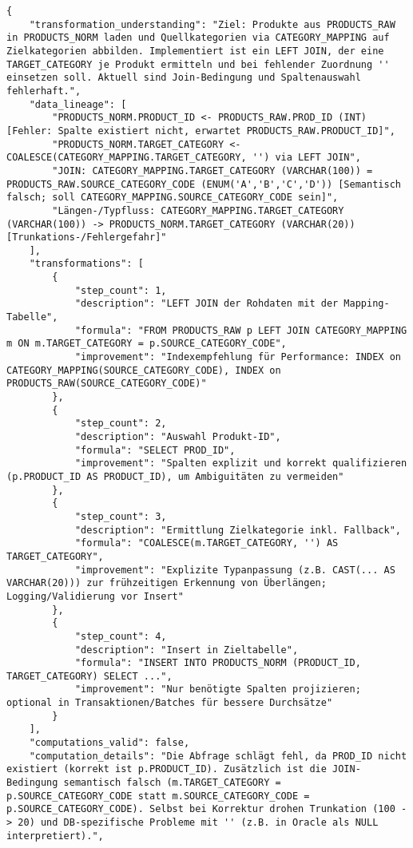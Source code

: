 \begin{lstlisting}[caption={Ausgabe: GPT-5 Anwendungsfall 6 Konsistenzdurchlauf},label={gpt_case6_prompt2}]
{
    "transformation_understanding": "Ziel: Produkte aus PRODUCTS_RAW in PRODUCTS_NORM laden und Quellkategorien via CATEGORY_MAPPING auf Zielkategorien abbilden. Implementiert ist ein LEFT JOIN, der eine TARGET_CATEGORY je Produkt ermitteln und bei fehlender Zuordnung '' einsetzen soll. Aktuell sind Join-Bedingung und Spaltenauswahl fehlerhaft.",
    "data_lineage": [
        "PRODUCTS_NORM.PRODUCT_ID <- PRODUCTS_RAW.PROD_ID (INT) [Fehler: Spalte existiert nicht, erwartet PRODUCTS_RAW.PRODUCT_ID]",
        "PRODUCTS_NORM.TARGET_CATEGORY <- COALESCE(CATEGORY_MAPPING.TARGET_CATEGORY, '') via LEFT JOIN",
        "JOIN: CATEGORY_MAPPING.TARGET_CATEGORY (VARCHAR(100)) = PRODUCTS_RAW.SOURCE_CATEGORY_CODE (ENUM('A','B','C','D')) [Semantisch falsch; soll CATEGORY_MAPPING.SOURCE_CATEGORY_CODE sein]",
        "Längen-/Typfluss: CATEGORY_MAPPING.TARGET_CATEGORY (VARCHAR(100)) -> PRODUCTS_NORM.TARGET_CATEGORY (VARCHAR(20)) [Trunkations-/Fehlergefahr]"
    ],
    "transformations": [
        {
            "step_count": 1,
            "description": "LEFT JOIN der Rohdaten mit der Mapping-Tabelle",
            "formula": "FROM PRODUCTS_RAW p LEFT JOIN CATEGORY_MAPPING m ON m.TARGET_CATEGORY = p.SOURCE_CATEGORY_CODE",
            "improvement": "Indexempfehlung für Performance: INDEX on CATEGORY_MAPPING(SOURCE_CATEGORY_CODE), INDEX on PRODUCTS_RAW(SOURCE_CATEGORY_CODE)"
        },
        {
            "step_count": 2,
            "description": "Auswahl Produkt-ID",
            "formula": "SELECT PROD_ID",
            "improvement": "Spalten explizit und korrekt qualifizieren (p.PRODUCT_ID AS PRODUCT_ID), um Ambiguitäten zu vermeiden"
        },
        {
            "step_count": 3,
            "description": "Ermittlung Zielkategorie inkl. Fallback",
            "formula": "COALESCE(m.TARGET_CATEGORY, '') AS TARGET_CATEGORY",
            "improvement": "Explizite Typanpassung (z.B. CAST(... AS VARCHAR(20))) zur frühzeitigen Erkennung von Überlängen; Logging/Validierung vor Insert"
        },
        {
            "step_count": 4,
            "description": "Insert in Zieltabelle",
            "formula": "INSERT INTO PRODUCTS_NORM (PRODUCT_ID, TARGET_CATEGORY) SELECT ...",
            "improvement": "Nur benötigte Spalten projizieren; optional in Transaktionen/Batches für bessere Durchsätze"
        }
    ],
    "computations_valid": false,
    "computation_details": "Die Abfrage schlägt fehl, da PROD_ID nicht existiert (korrekt ist p.PRODUCT_ID). Zusätzlich ist die JOIN-Bedingung semantisch falsch (m.TARGET_CATEGORY = p.SOURCE_CATEGORY_CODE statt m.SOURCE_CATEGORY_CODE = p.SOURCE_CATEGORY_CODE). Selbst bei Korrektur drohen Trunkation (100 -> 20) und DB-spezifische Probleme mit '' (z.B. in Oracle als NULL interpretiert).",

\end{lstlisting}

